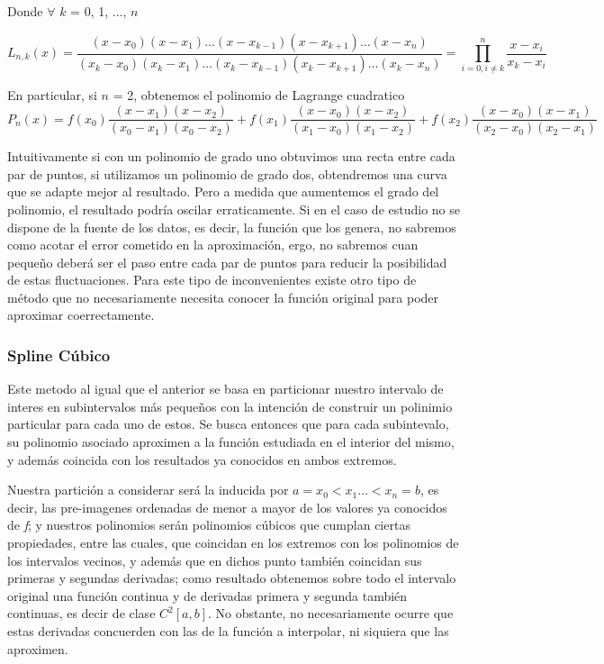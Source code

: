 Donde $\forall$ $k$ = 0, 1, $\dots$, $n$

\begin{equation}
	L_{n,k}(x) = \dfrac{(x - x_0)(x - x_1)\dots(x - x_{k-1})(x - x_{k+1})\dots(x - x_n)}{(x_k - x_0)(x_k - x_1)\dots(x_k - x_{k-1})(x_k - x_{k+1})\dots(x_k - x_n)} = \prod_{i=0, i \neq k}^{n} \dfrac{x - x_i}{x_k - x_i}
\end{equation}

En particular, si $n$ = 2, obtenemos el polinomio de Lagrange cuadratico
\begin{equation}
	P_n(x) = f(x_0)\dfrac{(x - x_1)(x - x_2)}{(x_0 - x_1)(x_0 - x_2)} + f(x_1)\dfrac{(x - x_0)(x - x_2)}{(x_1 - x_0)(x_1 - x_2)} + f(x_2)\dfrac{(x - x_0)(x - x_1)}{(x_2 - x_0)(x_2 - x_1)} 
\end{equation}

Intuitivamente si con un polinomio de grado uno obtuvimos una recta entre cada par de puntos, si utilizamos un polinomio de grado dos, obtendremos una curva que se adapte mejor al resultado. Pero a medida que aumentemos el grado del polinomio, el resultado podría oscilar erraticamente. Si en el caso de estudio no se dispone de la fuente de los datos, es decir, la función que los genera, no sabremos como acotar el error cometido en la aproximación, ergo, no sabremos cuan pequeño deberá ser el paso entre cada par de puntos para reducir la posibilidad de estas fluctuaciones. 
Para este tipo de inconvenientes existe otro tipo de método que no necesariamente necesita conocer la función original para poder aproximar coerrectamente.

\subsubsection{Spline Cúbico}

Este metodo al igual que el anterior se basa en particionar nuestro intervalo de interes en subintervalos más pequeños con la intención de construir un polinimio particular para cada uno de estos. Se busca entonces que para cada subintevalo, su polinomio asociado aproximen a la función estudiada en el interior del mismo, y además coincida con los resultados ya conocidos en ambos extremos. 

Nuestra partición a considerar será la inducida por $a = x_0 < x_1 \dots < x_n = b$, es decir, las pre-imagenes ordenadas de menor a mayor de los valores ya conocidos de \textit{f}; y nuestros polinomios serán polinomios cúbicos que cumplan ciertas propiedades, entre las cuales, que coincidan en los extremos con los polinomios de los intervalos vecinos, y además que en dichos punto también coincidan sus primeras y segundas derivadas; como resultado obtenemos sobre todo el intervalo original una función continua y de derivadas primera y segunda también continuas, es decir de clase $C^{2}[a, b]$. No obstante, no necesariamente ocurre que estas derivadas concuerden con las de la función a interpolar, ni siquiera que las aproximen.

